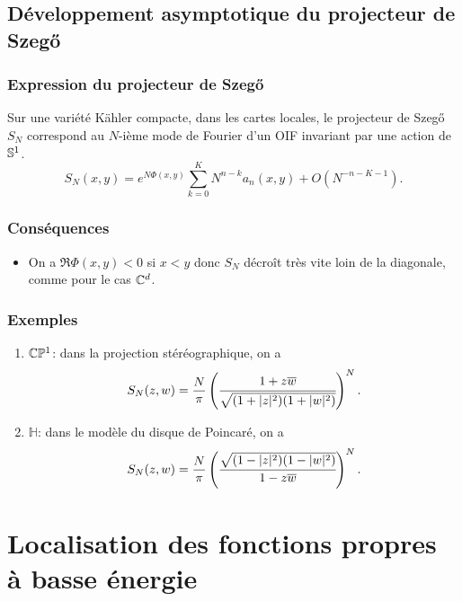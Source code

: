 \documentclass[mathserif]{beamer}
\begin{document}
\subsection{D\'eveloppement asymptotique du projecteur de Szeg\H{o}}
\begin{frame}
  \frametitle{Expression du projecteur de Szeg\H{o}}
  \begin{thm}
    Sur une vari\'et\'e K\"ahler compacte, dans les cartes locales, le
    projecteur de Szeg\H{o} $S_N$ correspond au $N$-ième mode de
    Fourier d'un OIF invariant par une action de $\S^1$.
    \[
      S_N(x,y)=e^{N\Phi(x,y)}\sum_{k=0}^KN^{n-k}a_n(x,y)+O(N^{-n-K-1}).
    \]
  \end{thm}
\end{frame}

\begin{frame}
  \frametitle{Cons\'equences}
\begin{itemize}
  \item 
  On a $\Re\Phi(x,y)<0$ si $x<y$ donc $S_N$ d\'ecroît très vite loin
  de la diagonale, comme pour le cas $\C^d$.
  \end{itemize}
  
\end{frame}

\begin{frame}
  \frametitle{Exemples}
  \begin{enumerate}
  \item $\C\mathbb{P}^1$: dans la projection st\'er\'eographique, on a
    \[
      S_N(z,w)=\frac{N}{\pi}\left(\cfrac{1+z\overline{w}}{\sqrt{(1+|z|^2)(1+|w|^2)}}\right)^N.
    \]
    
  \item $\mathbb{H}$: dans le modèle du disque de Poincar\'e, on
    a
    \[
      S_N(z,w)=\frac{N}{\pi}\left(\cfrac{\sqrt{(1-|z|^2)(1-|w|^2)}}{1-z\overline{w}}\right)^N.
    \]
    
  \end{enumerate}
\end{frame}

\section{Localisation des fonctions propres à basse \'energie}
\end{document}

